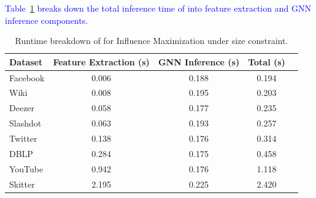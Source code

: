 \begin{table}[h]
\centering
\caption{Absolute inference runtime (seconds) for Influence Maximization under size constraint. *SS uses additional threads on large graphs to speed up pruning; all other algorithms use the same number of threads and GPUs.}
\label{tab:runtime_absolute}
\end{table}

\textcolor{blue}{Table~\ref{tab:runtime_breakdown} breaks down the total inference time of \llm into feature extraction and GNN inference components.}

\begin{table}[h!]
\centering
\caption{Runtime breakdown of \llm for Influence Maximization under size constraint.}
\label{tab:runtime_breakdown}
\begin{tabular}{lcccc}
\toprule
\textbf{Dataset} & \textbf{Feature Extraction (s)} & \textbf{GNN Inference (s)} & \textbf{Total (s)} \\
\midrule
Facebook & 0.006 & 0.188 & 0.194 \\
Wiki     & 0.008 & 0.195 & 0.203 \\
Deezer   & 0.058 & 0.177 & 0.235 \\
Slashdot & 0.063 & 0.193 & 0.257 \\
Twitter  & 0.138 & 0.176 & 0.314 \\
DBLP     & 0.284 & 0.175 & 0.458 \\
YouTube  & 0.942 & 0.176 & 1.118 \\
Skitter  & 2.195 & 0.225 & 2.420 \\
\bottomrule
\end{tabular}
\end{table}


